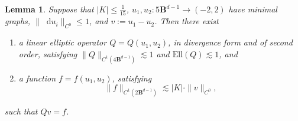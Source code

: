 \documentclass[reqno,11pt]{amsart}
\newcommand{\Ball}{\mathbf{B}}
\newcommand*\dif{\mathop{}\!\mathrm{d}}
\newcommand{\Ell}{\mathrm{Ell}}
\newtheorem{lemma}[theorem]{Lemma}
\theoremstyle{definition}
\numberwithin{equation}{section}
\begin{document}
\begin{lemma}\label{difference solves PDE}
Suppose that $|K| \leq \frac{1}{15}$, $u_1, u_2: 5\Ball^{d - 1} \to (-2, 2)$ have minimal graphs, $\|\dif u_i\|_{C^0} \leq 1$, and $v := u_1 - u_2$.
Then there exist
\begin{enumerate}
\item a linear elliptic operator $Q = Q(u_1, u_2)$, in divergence form and of second order, satisfying $\|Q\|_{C^1(4\Ball^{d - 1})} \lesssim 1$ and $\Ell(Q) \lesssim 1$, and
\item a function $f = f(u_1, u_2)$, satisfying
\begin{equation}\label{forcing term is perturbative}
	\|f\|_{C^1(2\Ball^{d - 1})} \lesssim |K| \cdot \|v\|_{C^0},
\end{equation}
\end{enumerate}
such that $Qv = f$.
\end{lemma}
\end{document}
